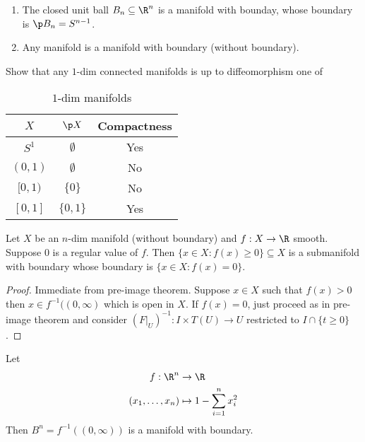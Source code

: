 \documentclass[a4paper]{article}
\begin{document}
\begin{eg}\leavevmode
  \begin{enumerate}
  \item The closed unit ball \(B_n \subseteq \R^n\) is a manifold with bounday, whose boundary is \(\p B_n = S^{n - 1}\).
  \item Any manifold is a manifold with boundary (without boundary).
  \end{enumerate}
\end{eg}

\begin{ex}
  Show that any \(1\)-dim connected manifolds is up to diffeomorphism one of
  \begin{table}[h!]
    \centering
    \begin{tabular}{|c|c|c|}
      \hline
      \(X\) & \(\p X\) & Compactness \\ \hline
      \(S^1\) & \(\emptyset\) & Yes \\ \hline
      \((0, 1)\) & \(\emptyset\) & No \\ \hline
      \([0, 1)\) & \(\{0\}\) & No \\ \hline
      \([0, 1]\) & \(\{0, 1\}\) & Yes \\ \hline
    \end{tabular}
    \caption{\(1\)-dim manifolds}
  \end{table}
\end{ex}

\begin{lemma}
  Let \(X\) be an \(n\)-dim manifold (without boundary) and \(f: X \to \R\) smooth. Suppose \(0\) is a regular value of \(f\). Then \(\{x \in X: f(x) \geq 0\} \subseteq X\) is a submanifold with boundary whose boundary is \(\{x \in X: f(x) = 0\}\).
\end{lemma}

\begin{proof}
  Immediate from pre-image theorem. Suppose \(x \in X\) such that \(f(x) > 0\) then \(x \in f^{-1}((0, \infty)\) which is open in \(X\). If \(f(x) = 0\), just proceed as in pre-image theorem and consider \((F|_U)^{-1}: I \times T(U) \to U\) restricted to \(I \cap \{t \geq 0\}\).
\end{proof}

\begin{eg}
  Let
  \begin{align*}
    f: \R^n &\to \R \\
    (x_1, \dots, x_n) &\mapsto 1 - \sum_{i = 1}^n x_i^2
  \end{align*}
  Then \(B^n = f^{-1}((0, \infty))\) is a manifold with boundary.
\end{eg}
\end{document}
